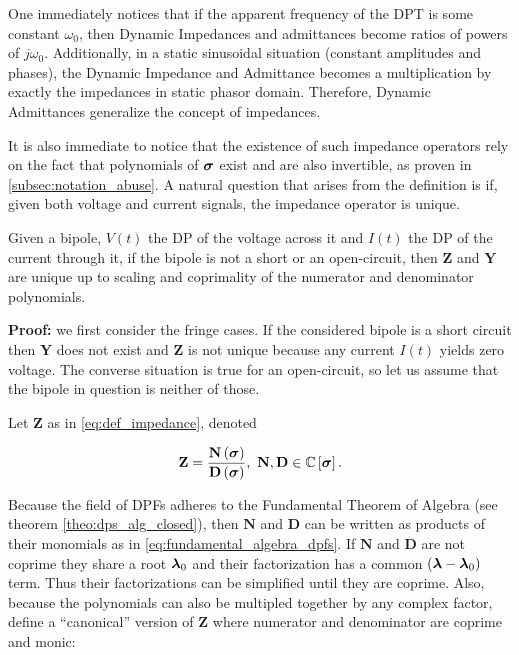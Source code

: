 	One immediately notices that if the apparent frequency of the DPT is some constant $\omega_0$, then Dynamic Impedances and admittances become ratios of powers of $j\omega_0$. Additionally, in a static sinusoidal situation (constant amplitudes and phases), the Dynamic Impedance and Admittance becomes a multiplication by exactly the impedances in static phasor domain. Therefore, Dynamic Admittances generalize the concept of impedances.

	It is also immediate to notice that the existence of such impedance operators rely on the fact that polynomials of $\boldsymbol{\sigma}$ exist and are also invertible, as proven in \ref{subsec:notation_abuse}. A natural question that arises from the definition is if, given both voltage and current signals, the impedance operator is unique.

\begin{theorem} \label{theo:impedance_uniqueness} %
	 Given a bipole, $V(t)$ the DP of the voltage across it and $I(t)$ the DP of the current through it, if the bipole is not a short or an open-circuit, then $\mathbf{Z}$ and $\mathbf{Y}$ are unique up to scaling and coprimality of the numerator and denominator polynomials. \end{theorem}
\noindent\textbf{Proof:} we first consider the fringe cases. If the considered bipole is a short circuit then $\mathbf{Y}$ does not exist and $\mathbf{Z}$ is not unique because any current $I(t)$ yields zero voltage. The converse situation is true for an open-circuit, so let us assume that the bipole in question is neither of those.

	Let $\mathbf{Z}$ as in \eqref{eq:def_impedance}, denoted

\begin{equation} \mathbf{Z} = \dfrac{\mathbf{N}\left(\dpo\right)}{\mathbf{D}\left(\dpo\right)},\ \mathbf{N,D}\in\mathbb{C}\left[\dpo\right] . \end{equation}

	Because the field of DPFs adheres to the Fundamental Theorem of Algebra (see theorem \ref{theo:dps_alg_closed}), then $\mathbf{N}$ and $\mathbf{D}$ can be written as products of their monomials as in \eqref{eq:fundamental_algebra_dpfs}. If $\mathbf{N}$ and $\mathbf{D}$ are not coprime they share a root $\boldsymbol{\lambda}_0$ and their factorization has a common $\left(\boldsymbol{\lambda} - \boldsymbol{\lambda}_0\right)$ term. Thus their factorizations can be simplified until they are coprime. Also, because the polynomials can also be multipled together by any complex factor, define a ``canonical'' version of $\mathbf{Z}$ where numerator and denominator are coprime and monic:

